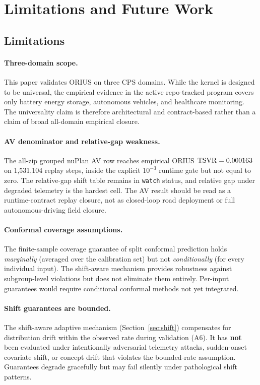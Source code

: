 \section{Limitations and Future Work}\label{sec:limitations}

\subsection{Limitations}

\paragraph{Three-domain scope.}
This paper validates ORIUS on three CPS domains.  While the kernel is designed to
be universal, the empirical evidence in the active repo-tracked program covers only
battery energy storage, autonomous vehicles, and healthcare monitoring.  The
universality claim is therefore architectural and contract-based rather than a claim
of broad all-domain empirical closure.

\paragraph{AV denominator and relative-gap weakness.}
The all-zip grouped nuPlan AV row reaches empirical ORIUS $\mathrm{TSVR}=0.000163$
on 1{,}531{,}104 replay steps, inside the explicit $10^{-3}$ runtime gate but
not equal to zero.  The relative-gap shift table remains in \texttt{watch} status,
and relative gap under degraded telemetry is the hardest cell.  The AV result should
be read as a runtime-contract replay closure, not as closed-loop road deployment or
full autonomous-driving field closure.

\paragraph{Conformal coverage assumptions.}
The finite-sample coverage guarantee of split conformal prediction holds
\emph{marginally} (averaged over the calibration set) but not \emph{conditionally}
(for every individual input).  The shift-aware mechanism provides robustness against
subgroup-level violations but does not eliminate them entirely.  Per-input guarantees
would require conditional conformal methods not yet integrated.

\paragraph{Shift guarantees are bounded.}
The shift-aware adaptive mechanism (Section~\ref{sec:shift}) compensates for
distribution drift within the observed rate during validation (A6).  It has
\textbf{not} been evaluated under intentionally adversarial telemetry attacks,
sudden-onset covariate shift, or concept drift that violates the bounded-rate
assumption.  Guarantees degrade gracefully but may fail silently under pathological
shift patterns.

